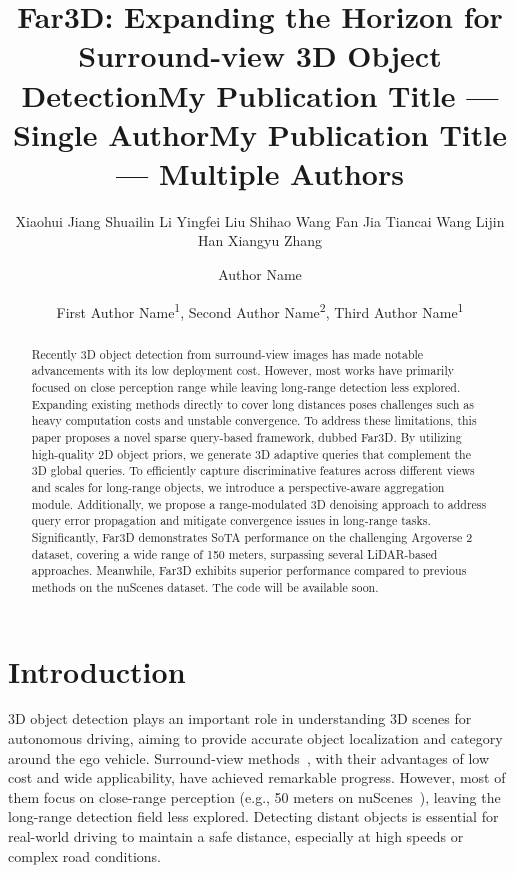 \documentclass[letterpaper]{article} \usepackage{aaai24}
\title{Far3D: Expanding the Horizon for Surround-view 3D Object Detection}
\author{
Xiaohui Jiang  \hspace{0.25cm} Shuailin Li  \hspace{0.25cm} Yingfei Liu \hspace{0.25cm} Shihao Wang \hspace{0.25cm} Fan Jia \hspace{0.25cm} Tiancai Wang \hspace{0.25cm} Lijin Han  \hspace{0.25cm}  Xiangyu Zhang \\ }
\title{My Publication Title --- Single Author}
\author {
    Author Name
}
\title{My Publication Title --- Multiple Authors}
\author {
First Author Name\textsuperscript{\rm 1},
    Second Author Name\textsuperscript{\rm 2},
    Third Author Name\textsuperscript{\rm 1}
}
\newcommand{\far}{Far3D}
\begin{document}
\maketitle
\let\thefootnote\relax{} 
\let\thefootnote\relax{} \begin{abstract}
Recently 3D object detection from surround-view images has made notable advancements with its low deployment cost. However, most works have primarily focused on close perception range while leaving long-range detection less explored.
Expanding existing methods directly to cover long distances poses challenges such as heavy computation costs and unstable convergence. 
To address these limitations, this paper proposes a novel sparse query-based framework, dubbed \far{}. By utilizing high-quality 2D object priors, we generate 3D adaptive queries that complement the 3D global queries.
To efficiently capture discriminative features across different views and scales for long-range objects, we introduce a perspective-aware aggregation module. Additionally, we propose a range-modulated 3D denoising approach to address query error propagation and mitigate convergence issues in long-range tasks.
Significantly, \far{} demonstrates SoTA performance on the challenging Argoverse 2 dataset, covering a wide range of 150 meters, surpassing several LiDAR-based approaches. Meanwhile, \far{} exhibits superior performance compared to previous methods on the nuScenes dataset.
The code will be available soon.






\end{abstract}  \section{Introduction}

3D object detection plays an important role in understanding 3D scenes for autonomous driving, aiming to provide accurate object localization and category around the ego vehicle. Surround-view methods~\cite{huang2022bevdet4d, li2023bevdepth, liu2022petrv2,  li2022bevformer, yang2023bevformer, park2022time, wang2023exploring}, 
with their advantages of low cost and wide applicability, have achieved remarkable progress. 
However, most of them focus on close-range perception (e.g., 50 meters on nuScenes~\cite{caesar2020nuscenes}), leaving the long-range detection field less explored. Detecting distant objects is essential for real-world driving to maintain a safe distance, especially at high speeds or complex road conditions.
\end{document}
